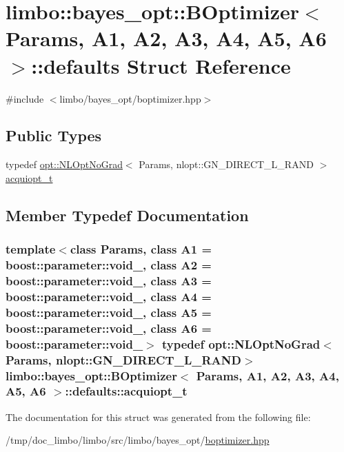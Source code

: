 \hypertarget{structlimbo_1_1bayes__opt_1_1_b_optimizer_1_1defaults}{}\section{limbo\+:\+:bayes\+\_\+opt\+:\+:B\+Optimizer$<$ Params, A1, A2, A3, A4, A5, A6 $>$\+:\+:defaults Struct Reference}
\label{structlimbo_1_1bayes__opt_1_1_b_optimizer_1_1defaults}


{\ttfamily \#include $<$limbo/bayes\+\_\+opt/boptimizer.\+hpp$>$}

\subsection*{Public Types}
\begin{DoxyCompactItemize}
\item 
typedef \hyperlink{structlimbo_1_1opt_1_1_n_l_opt_no_grad}{opt\+::\+N\+L\+Opt\+No\+Grad}$<$ Params, nlopt\+::\+G\+N\+\_\+\+D\+I\+R\+E\+C\+T\+\_\+\+L\+\_\+\+R\+A\+N\+D $>$ \hyperlink{structlimbo_1_1bayes__opt_1_1_b_optimizer_1_1defaults_af714505103b93f5a2028030a192cc955}{acquiopt\+\_\+t}
\end{DoxyCompactItemize}


\subsection{Member Typedef Documentation}
\hypertarget{structlimbo_1_1bayes__opt_1_1_b_optimizer_1_1defaults_af714505103b93f5a2028030a192cc955}{}
\subsubsection[{acquiopt\+\_\+t}]{\setlength{\rightskip}{0pt plus 5cm}template$<$class Params, class A1 = boost\+::parameter\+::void\+\_\+, class A2 = boost\+::parameter\+::void\+\_\+, class A3 = boost\+::parameter\+::void\+\_\+, class A4 = boost\+::parameter\+::void\+\_\+, class A5 = boost\+::parameter\+::void\+\_\+, class A6 = boost\+::parameter\+::void\+\_\+$>$ typedef {\bf opt\+::\+N\+L\+Opt\+No\+Grad}$<$Params, nlopt\+::\+G\+N\+\_\+\+D\+I\+R\+E\+C\+T\+\_\+\+L\+\_\+\+R\+A\+N\+D$>$ {\bf limbo\+::bayes\+\_\+opt\+::\+B\+Optimizer}$<$ Params, A1, A2, A3, A4, A5, A6 $>$\+::{\bf defaults\+::acquiopt\+\_\+t}}\label{structlimbo_1_1bayes__opt_1_1_b_optimizer_1_1defaults_af714505103b93f5a2028030a192cc955}


The documentation for this struct was generated from the following file\+:\begin{DoxyCompactItemize}
\item 
/tmp/doc\+\_\+limbo/limbo/src/limbo/bayes\+\_\+opt/\hyperlink{boptimizer_8hpp}{boptimizer.\+hpp}\end{DoxyCompactItemize}
